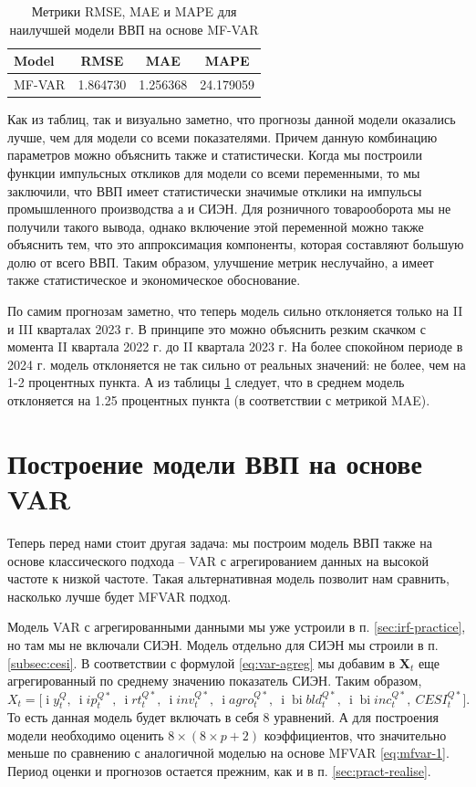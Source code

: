 \documentclass[a4paper, 14pt]{extreport}
\numberwithin{equation}{section}
\renewcommand{\i}{\operatorname{i}}
\newcommand{\bi}{\operatorname{bi}}
\numberwithin{equation}{section}
\begin{document}
		\begin{table}[h!]
		\centering
		\caption{Метрики RMSE, MAE и MAPE для наилучшей модели ВВП на основе MF-VAR}
		\begin{tabular}{lccc}
			\toprule
			\textbf{Model} & \textbf{RMSE} & \textbf{MAE} & \textbf{MAPE} \\ 
			\midrule
			MF-VAR & 1.864730 & 1.256368 & 24.179059 \\ 
			\bottomrule
		\end{tabular}
		\label{tab:mfvar-metrics}
	\end{table}
	
	Как из таблиц, так и визуально заметно, что прогнозы данной модели оказались лучше, чем для модели со всеми показателями. 
	Причем данную комбинацию параметров можно объяснить также и статистически. Когда мы построили функции импульсных откликов для модели со всеми переменными, то мы заключили, что ВВП имеет статистически значимые отклики на импульсы промышленного производства а и СИЭН. Для розничного товарооборота мы не получили такого вывода, однако включение этой переменной можно также объяснить тем, что это аппроксимация компоненты, которая составляют большую долю от всего ВВП. Таким образом, улучшение метрик неслучайно, а имеет также статистическое и экономическое обоснование.
	
	По самим прогнозам заметно, что теперь модель сильно отклоняется только на II и III кварталах 2023 г. В принципе это можно объяснить резким скачком с момента II квартала 2022 г. до II квартала 2023 г. На более спокойном периоде в 2024 г. модель отклоняется не так сильно от реальных значений: не более, чем на 1-2 процентных пункта. А из таблицы \ref{tab:mfvar-metrics} следует, что в среднем модель отклоняется на 1.25 процентных пункта (в соответствии с метрикой MAE).
	
	\section{Построение модели ВВП на основе VAR}
	Теперь перед нами стоит другая задача: мы построим модель ВВП также на основе классического подхода -- VAR с агрегированием данных на высокой частоте к низкой частоте. Такая альтернативная модель позволит нам сравнить, насколько лучше будет MFVAR подход.
	
	Модель VAR с агрегированными данными мы уже устроили в п. \ref{sec:irf-practice}, но там мы не включали СИЭН. Модель отдельно для СИЭН мы строили в п. \ref{subsec:cesi}. В соответствии с формулой \eqref{eq:var-agreg} мы добавим в $\mathbf X_t$ еще агрегированный по среднему значению показатель СИЭН. Таким образом, 
	$$X_t = \Big[\i y_t^{Q},\ \i ip_t^{Q*},\ \i rt_t^{Q*},\ \i inv_t^{Q*},\ \i agro_t^{Q*},\ \i \bi bld_t^{Q*},\ \i \bi inc_t^{Q*},\ CESI_t^{Q*}\Big].$$
	То есть данная модель будет включать в себя 8 уравнений. А для построения модели необходимо оценить $8\times(8\times p + 2)$ коэффициентов, что значительно меньше по сравнению с аналогичной моделью на основе MFVAR \eqref{eq:mfvar-1}. Период оценки и прогнозов остается прежним, как и в п. \ref{sec:pract-realise}.
	
\end{document}
